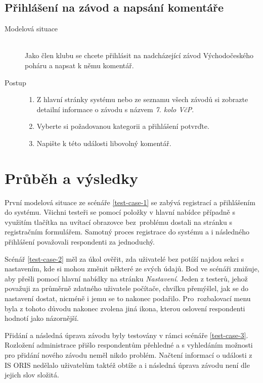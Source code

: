 \subsection{Přihlášení na závod a napsání komentáře}\label{test-case-4}
\begin{description}
    \item[Modelová situace] \hfill \\
        Jako člen klubu se chcete přihlásit na nadcházející závod Východočeského poháru a napsat k němu komentář.
    \item[Postup] \hfill
        \vspace{-2mm}
        \begin{enumerate}
            \item Z hlavní stránky systému nebo ze seznamu všech závodů si zobrazte detailní informace o závodu s názvem \emph{7. kolo VčP}.
            \item Vyberte si požadovanou kategorii a přihlášení potvrďte.
            \item Napište k této události libovolný komentář.
        \end{enumerate}
\end{description}

\section{Průběh a výsledky}
První modelová situace ze scénáře \ref{test-case-1} se zabývá registrací a přihlášením do systému. Všichni testeři se pomocí položky v hlavní nabídce případně s využitím tlačítka na uvítací obrazovce bez~problému dostali na stránku s registračním formulářem. Samotný proces registrace do systému a i následného přihlášení považovali respondenti za jednoduchý.

Scénář \ref{test-case-2} měl za úkol ověřit, zda uživatelé bez potíží najdou sekci s nastavením, kde si mohou změnit některé ze svých údajů. Bod ve scénáři zmiňuje, aby přešli pomocí hlavní nabídky na stránku \emph{Nastavení}. Jeden z testerů, jehož považuji za průměrně zdatného uživatele počítače, chvilku přemýšlel, jak se do nastavení dostat, nicméně i jemu se to nakonec podařilo. Pro~rozbalovací menu byla z tohoto důvodu nakonec zvolena jiná ikona, kterou oslovení respondenti hodnotí jako názornější.

Přidání a následná úprava závodu byly testovány v rámci scénáře \ref{test-case-3}. Rozložení administrace přišlo respondentům přehledné a s vyhledáním možnosti pro přidání nového závodu neměl nikdo problém. Načtení informací o události z IS ORIS nedělalo uživatelům taktéž obtíže a i následná úprava závodu není dle jejich slov složitá.

